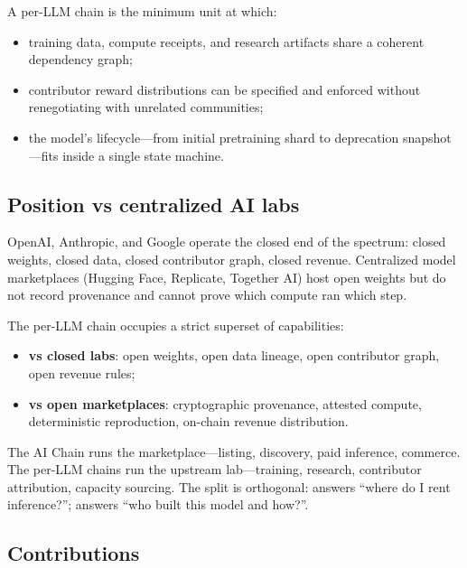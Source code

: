A per-LLM chain is the minimum unit at which:
\begin{itemize}[nosep]
\item training data, compute receipts, and research artifacts share a coherent dependency graph;
\item contributor reward distributions can be specified and enforced without renegotiating with unrelated communities;
\item the model's lifecycle---from initial pretraining shard to deprecation snapshot---fits inside a single state machine.
\end{itemize}

\subsection{Position vs centralized AI labs}

OpenAI, Anthropic, and Google operate the closed end of the spectrum: closed weights, closed data, closed contributor graph, closed revenue. Centralized model marketplaces (Hugging Face, Replicate, Together AI) host open weights but do not record provenance and cannot prove which compute ran which step.

The per-LLM chain occupies a strict superset of capabilities:
\begin{itemize}[nosep]
\item \textbf{vs closed labs}: open weights, open data lineage, open contributor graph, open revenue rules;
\item \textbf{vs open marketplaces}: cryptographic provenance, attested compute, deterministic reproduction, on-chain revenue distribution.
\end{itemize}

The \Hanzo{} AI Chain \cite{hanzo-ai-chain} runs the marketplace---listing, discovery, paid inference, commerce. The \Zoo{} per-LLM chains run the upstream lab---training, research, contributor attribution, capacity sourcing. The split is orthogonal: \Hanzo{} answers ``where do I rent inference?''; \Zoo{} answers ``who built this model and how?''.

\subsection{Contributions}

